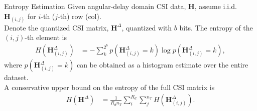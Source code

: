 \documentclass{beamer}
\begin{document}

  \begin{frame}{Entropy Estimation}
    \footnotesize{
      Given angular-delay domain CSI data, $\mathbf H$, assume i.i.d. $\mathbf H_{(i,j)}$ for $i$-th ($j$-th) row (col).\\ \vspace{8pt}
      \pause
      Denote the quantized CSI matrix, $\mathbf H^\Delta$, quantized with $b$ bits. The entropy of the $(i,j)$-th element is
      \begin{align*}
        H(\mathbf H^\Delta_{(i,j)}) &= - \sum_{k}^{2^b} p(\mathbf H^\Delta_{(i,j)} = k) \log p(\mathbf H^\Delta_{(i,j)} = k),
      \end{align*}
      where $p(\mathbf H^\Delta_{(i,j)} = k)$ can be obtained as a histogram estimate over the entire dataset.\\ \vspace{8pt}
      \pause
      A conservative upper bound on the entropy of the full CSI matrix is
      \begin{align*}
        H(\mathbf H^\Delta) &= \frac{1}{R_d n_T} \sum_{i}^{R_d}\sum_{j}^{n_T} H(\mathbf H^\Delta_{(i,j)}).
      \end{align*}
    }
  \end{frame}
\end{document}
